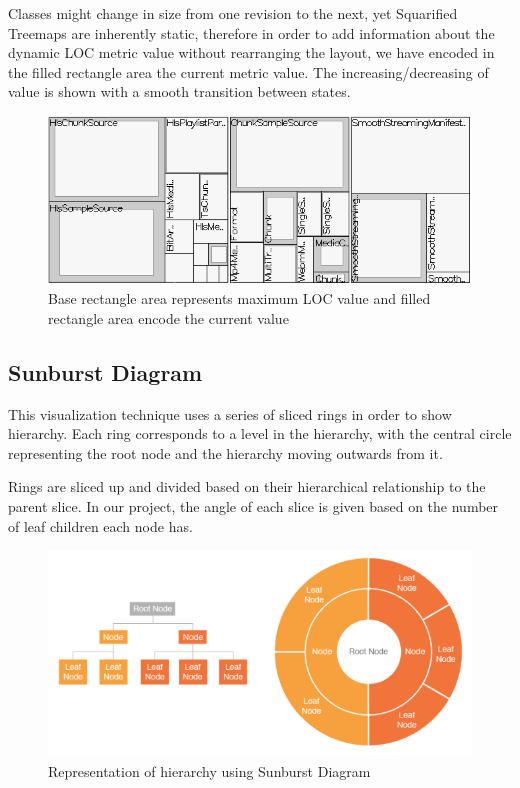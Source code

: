 Classes might change in size from one revision to the next, yet Squarified Treemaps are inherently static, therefore in order to add information about the dynamic LOC metric value without rearranging the layout, we have encoded in the filled rectangle area the current metric value. The increasing/decreasing of value is shown with a smooth transition between states.

\begin{figure}[H]
  \centering
  \includegraphics[width=1\textwidth]{figures/dynamic_treemap.png}
  \caption{Base rectangle area represents maximum LOC value and filled rectangle area encode the current value}
  \label{fig:dynamic_treemap}
\end{figure}

\subsection{Sunburst Diagram}
This visualization technique uses a series of sliced rings in order to show hierarchy. Each ring corresponds to a level in the hierarchy, with the central circle representing the root node and the hierarchy moving outwards from it.

Rings are sliced up and divided based on their hierarchical relationship to the parent slice. In our project, the angle of each slice is given based on the number of leaf children each node has.

\begin{figure}[H]
  \centering
  \includegraphics[width=1\textwidth]{figures/sunburst_catalog.png}
  \caption{Representation of hierarchy using Sunburst Diagram}
  \label{fig:sunburst_catalog}
\end{figure}


